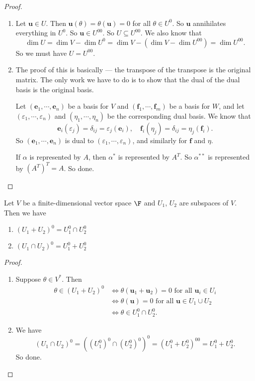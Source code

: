 \documentclass[a4paper]{article}
\begin{document}
\begin{proof}\leavevmode
  \begin{enumerate}
    \item Let $\mathbf{u} \in U$. Then $\mathbf{u}(\theta) = \theta(\mathbf{u}) = 0$ for all $\theta \in U^0$. So $\mathbf{u}$ annihilates everything in $U^0$. So $\mathbf{u} \in U^{00}$. So $U \subseteq U^{00}$. We also know that
      \[
        \dim U = \dim V - \dim U^0 = \dim V - (\dim V - \dim U^{00}) = \dim U^{00}.
      \]
      So we must have $U = U^{00}$.
    \item The proof of this is basically --- the transpose of the transpose is the original matrix. The only work we have to do is to show that the dual of the dual basis is the original basis.

      Let $(\mathbf{e}_1, \cdots, \mathbf{e}_n)$ be a basis for $V$ and $(\mathbf{f}_1, \cdots, \mathbf{f}_m)$ be a basis for $W$, and let $(\varepsilon_1, \cdots, \varepsilon_n)$ and $(\eta_1, \cdots, \eta_n)$ be the corresponding dual basis. We know that
      \[
        \mathbf{e}_i(\varepsilon_j) = \delta_{ij} = \varepsilon_j(\mathbf{e}_i),\quad \mathbf{f}_i(\eta_j) = \delta_{ij} = \eta_j(\mathbf{f}_i).
      \]
      So $(\mathbf{e}_1, \cdots, \mathbf{e}_n)$ is dual to $(\varepsilon_1, \cdots, \varepsilon_n)$, and similarly for $\mathbf{f}$ and $\eta$.

      If $\alpha$ is represented by $A$, then $\alpha^*$ is represented by $A^T$. So $\alpha^{**}$ is represented by $(A^T)^T = A$. So done.\qedhere
  \end{enumerate}
\end{proof}

\begin{prop}
  Let $V$ be a finite-dimensional vector space $\F$ and $U_1$, $U_2$ are subspaces of $V$. Then we have
  \begin{enumerate}
    \item $(U_1 + U_2)^0 = U_1^0 \cap U_2^0$
    \item $(U_1 \cap U_2)^0 = U_1^0 + U_2^0$
  \end{enumerate}
\end{prop}

\begin{proof}\leavevmode
  \begin{enumerate}
    \item Suppose $\theta \in V^*$. Then
      \begin{align*}
        \theta \in (U_1 + U_2)^0 &\Leftrightarrow \theta (\mathbf{u}_1 + \mathbf{u}_2) = 0\text{ for all }\mathbf{u}_i \in U_i\\
        &\Leftrightarrow \theta (\mathbf{u}) = 0\text{ for all }\mathbf{u} \in U_1 \cup U_2\\
        &\Leftrightarrow \theta \in U_1^0 \cap U_2^0.
      \end{align*}
    \item We have
      \[
        (U_1 \cap U_2)^0 = ((U_1^0)^0 \cap (U_2^0)^0)^0 = (U_1^0 + U_2^0)^{00} = U_1^0 + U_2^0.
      \]
      So done.\qedhere
  \end{enumerate}
\end{proof}
\end{document}
